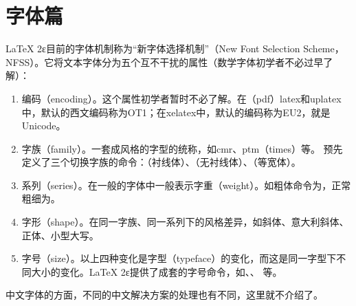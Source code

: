 %
%
%
%

\section{字体篇}



LaTeX 2ε目前的字体机制称为``新字体选择机制''（New Font Selection
Scheme，NFSS）。它将文本字体分为五个互不干扰的属性（数学字体初学者不必过早了解）：
\begin{enumerate}
  \item
    编码（encoding）。这个属性初学者暂时不必了解。在（pdf）latex和uplatex中，默认的西文编码称为OT1；在xelatex中，默认的编码称为EU2，就是Unicode。
  \item
    字族（family）。一套成风格的字型的统称，如cmr、ptm（times）等。\LaTeXe{}
    预先定义了三个切换字族的命令：（衬线体）、（无衬线体）、（等宽体）。
  \item
    系列（series）。在一般的字体中一般表示字重（weight）。如粗体命令为，正常粗细为。
  \item
    字形（shape）。在同一字族、同一系列下的风格差异，如斜体、意大利斜体、正体、小型大写。
  \item
    字号（size）。以上四种变化是字型（typeface）的变化，而这是同一字型下不同大小的变化。LaTeX
    2ε提供了成套的字号命令，如、、 等。
\end{enumerate}

中文字体的方面，不同的中文解决方案的处理也有不同，这里就不介绍了。








